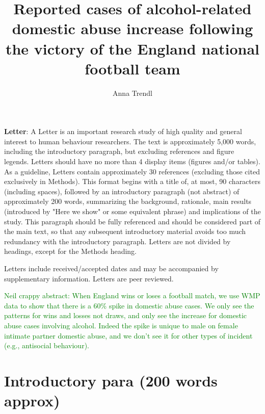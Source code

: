 \documentclass[12pt, letterpaper]{article}
\newcommand{\NS}[1] {{\textcolor{green}{#1}}}
\begin{document}
\title{Reported cases of alcohol-related domestic abuse increase following the victory of the England national football team}


\author{Anna Trendl}
\textbf{Letter}:
A Letter is an important research study of high quality and general interest to human behaviour researchers.  The text is approximately 5,000 words, including the introductory paragraph, but excluding references and figure legends. Letters should have no more than 4 display items (figures and/or tables). As a guideline, Letters contain approximately 30 references (excluding those cited exclusively in Methods). This format begins with a title of, at most, 90 characters (including spaces), followed by an introductory paragraph (not abstract) of approximately 200 words, summarizing the background, rationale, main results (introduced by "Here we show" or some equivalent phrase) and implications of the study. This paragraph should be fully referenced and should be considered part of the main text, so that any subsequent introductory material avoids too much redundancy with the introductory paragraph. Letters are not divided by headings, except for the Methods heading.

Letters include received/accepted dates and may be accompanied by supplementary information. Letters are peer reviewed.

\NS{Neil crappy abstract: When England wins or loses a football match, we use WMP data to show that there is a 60\% spike in domestic abuse cases.  We only see the patterns for wins and losses not draws, and only see the increase for domestic abuse cases involving alcohol. Indeed the spike is unique to male on female intimate partner domestic abuse, and we don't see it for other types of incident (e.g., antisocial behaviour).}

\section{Introductory para (200 words approx)}
\end{document}

